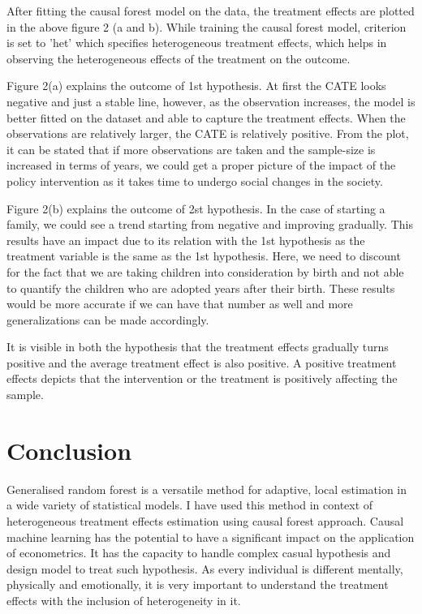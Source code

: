 \documentclass[11pt, a4paper, leqno]{article}
\begin{document}
After fitting the causal forest model on the data, the treatment effects are plotted in the above figure 2 (a and b). While training the causal 
forest model, criterion is set to 'het' which specifies heterogeneous treatment effects, which helps in observing the heterogeneous effects of the 
treatment on the outcome.

Figure 2(a) explains the outcome of 1st hypothesis. At first the CATE looks negative and just a stable line, however, as the observation increases,
 the model is better fitted on the dataset and able to capture the treatment effects. When the observations are relatively larger, the CATE is 
 relatively positive. From the plot, it can be stated that if more observations are taken and the sample-size is increased in terms of years, we could
 get a proper picture of the impact of the policy intervention as it takes time to undergo social changes in the society.
 
Figure 2(b) explains the outcome of 2st hypothesis. In the case of starting a family, we could see a trend starting from negative and improving
gradually. This results have an impact due to its relation with the 1st hypothesis as the treatment variable is the same as the 1st hypothesis. 
Here, we need to discount for the fact that we are taking children into consideration by birth and not able to quantify the children who are adopted 
years after their birth. These results would be more accurate if we can have that number as well and more generalizations can be made accordingly.

It is visible in both the hypothesis that the treatment effects gradually turns positive and the average treatment effect is also positive. A 
positive treatment effects depicts that the intervention or the treatment is positively affecting the sample.

\section{Conclusion} %
\label{sec:Conclusion}

Generalised random forest is a versatile method for adaptive, local estimation in a wide variety of statistical models. I have used this method 
in context of heterogeneous treatment effects estimation using causal forest approach. Causal machine learning has the potential to have a 
significant impact on the application of econometrics. It has the capacity to handle complex casual hypothesis and design model to treat such 
hypothesis. As every individual is different mentally, physically and emotionally, it is very important to understand the treatment effects with 
the inclusion of heterogeneity in it.
\end{document}
